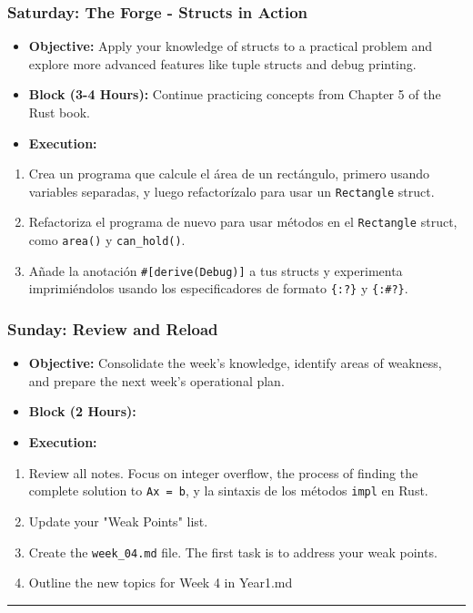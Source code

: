 \documentclass[11pt,a4paper]{report}
\begin{document}
\subsubsection{\textbf{Saturday: The Forge - Structs in Action}}
\begin{itemize}
  \item \textbf{Objective:} Apply your knowledge of structs to a practical problem and explore more advanced features like tuple structs and debug printing.
  \item \textbf{Block (3-4 Hours):} Continue practicing concepts from Chapter 5 of the Rust book.
  \item \textbf{Execution:}
\end{itemize}
\begin{enumerate}
  \item Crea un programa que calcule el área de un rectángulo, primero usando variables separadas, y luego refactorízalo para usar un \texttt{Rectangle} struct.
  \item Refactoriza el programa de nuevo para usar métodos en el \texttt{Rectangle} struct, como \texttt{area()} y \texttt{can\_hold()}.
  \item Añade la anotación \texttt{\#[derive(Debug)]} a tus structs y experimenta imprimiéndolos usando los especificadores de formato \texttt{\{:?\}} y \texttt{\{:\#?\}}.

\end{enumerate}
\subsubsection{\textbf{Sunday: Review and Reload}}
\begin{itemize}
  \item \textbf{Objective:} Consolidate the week's knowledge, identify areas of weakness, and prepare the next week's operational plan.
  \item \textbf{Block (2 Hours):}
  \item \textbf{Execution:}
\end{itemize}
\begin{enumerate}
  \item Review all notes. Focus on integer overflow, the process of finding the complete solution to \texttt{Ax = b}, y la sintaxis de los métodos \texttt{impl} en Rust.
  \item Update your "Weak Points" list.
  \item Create the \texttt{week\_04.md} file. The first task is to address your weak points.
  \item Outline the new topics for Week 4 in Year1.md

\end{enumerate}
\noindent\rule{\textwidth}{0.4pt}
\end{document}
